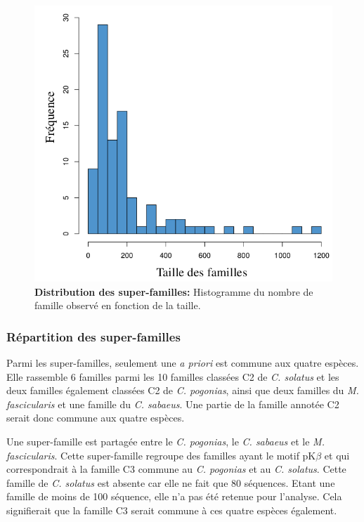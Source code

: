\documentclass[12pt,a4paper]{article}
\begin{document}
	\begin{figure}	
	\center
	\includegraphics[scale=0.3]{img/distribution_SF.png}
	\caption{\textbf{Distribution des super-familles:} Histogramme du nombre de famille observé en fonction de la taille. 
	\label{distribution_SF}
		} 
	\end{figure}
	
	\subsubsection{Répartition des super-familles}
	Parmi les super-familles, seulement une \textit{a priori} est commune aux quatre espèces. Elle rassemble 6 familles parmi les 10 familles classées C2 de \textit{C. solatus} et les deux familles également classées C2 de \textit{C. pogonias}, ainsi que deux familles du \textit{M. fascicularis} et une famille du \textit{C. sabaeus}. Une partie de la famille annotée C2 serait donc commune aux quatre espèces.
	
	Une super-famille est partagée entre le \textit{C. pogonias}, le \textit{C. sabaeus} et le \textit{M. fascicularis}. Cette super-famille regroupe des familles ayant le motif pK$\beta$ et qui correspondrait à la famille C3 commune au \textit{C. pogonias} et au \textit{C. solatus}. Cette famille de \textit{C. solatus} est absente car elle ne fait que 80 séquences. Etant une famille de moins de 100 séquence, elle n'a pas été retenue pour l'analyse. Cela signifierait que la famille C3 serait commune à ces quatre espèces également.
	
\end{document}
